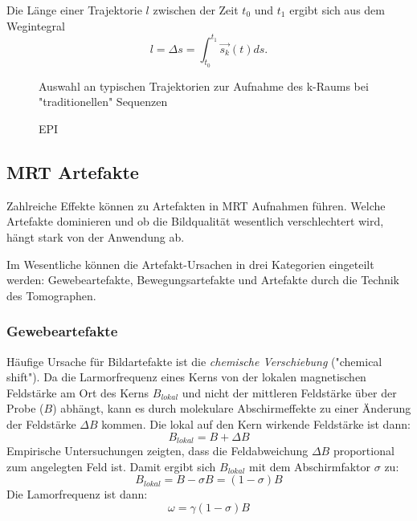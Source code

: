 Die Länge einer Trajektorie $l$ zwischen der Zeit $t_0$ und $t_1$ ergibt sich aus dem Wegintegral
\begin{equation}
	l=\Delta s = \int_{t_0}^{t_1} \vec{s_k}(t) ds.
\end{equation}

\begin{figure}[H]
	\centering
	\hfill
	\hfill
	\caption{Auswahl an typischen Trajektorien zur Aufnahme des k-Raums bei "traditionellen" Sequenzen}
\end{figure}

\begin{figure}[H]
	\centering
	\caption[Echoplanar Sequenz]{EPI}
	\label{fig:EPI}
\end{figure}


\subsection{MRT Artefakte}
Zahlreiche Effekte können zu Artefakten in MRT Aufnahmen führen. Welche Artefakte dominieren und ob die Bildqualität wesentlich verschlechtert wird, hängt stark von der Anwendung ab.

Im Wesentliche können die Artefakt-Ursachen in drei Kategorien eingeteilt werden: Gewebeartefakte, Bewegungsartefakte und Artefakte durch die Technik des Tomographen.

\subsubsection{Gewebeartefakte}
Häufige Ursache für Bildartefakte ist die \textit{chemische Verschiebung} ("chemical shift"). Da die Larmorfrequenz eines Kerns von der lokalen magnetischen Feldstärke am Ort des Kerns $B_{lokal}$ und nicht der mittleren Feldstärke über der Probe ($B$) abhängt, kann es durch molekulare Abschirmeffekte zu einer Änderung der Feldstärke $\Delta B$ kommen. Die lokal auf den Kern wirkende Feldstärke ist dann:
\begin{equation}
	B_{lokal}=B+\Delta B
\end{equation}
Empirische Untersuchungen zeigten, dass die Feldabweichung $\Delta B$ proportional zum angelegten Feld ist. Damit ergibt sich $B_{lokal}$ mit dem Abschirmfaktor $\sigma$ zu:
\begin{equation}
	B_{lokal}=B-\sigma B = (1-\sigma)B
\end{equation}
Die Lamorfrequenz ist dann:
\begin{equation}
	\omega = \gamma (1-\sigma)B
\end{equation}

